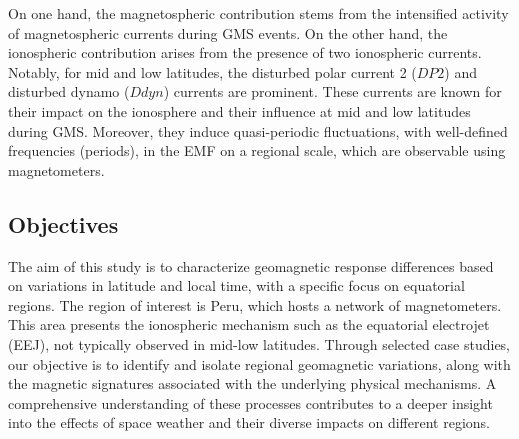\documentclass[12pt]{article}
\begin{document}
On one hand, the magnetospheric contribution stems from the intensified activity of magnetospheric currents during GMS events. On the other hand, the ionospheric contribution arises from the presence of two ionospheric currents. Notably, for mid and low latitudes, the disturbed polar current 2 ($DP2$) \citep{nishida_68_fluctuations} and disturbed dynamo ($Ddyn$) \citep{blanc_ddyn} currents are prominent. These currents are known for their impact on the ionosphere and their influence at mid and low latitudes during GMS. Moreover, they induce quasi-periodic fluctuations, with well-defined frequencies (periods), in the EMF on a regional scale, which are observable using magnetometers.


\subsection{Objectives}

The aim of this study is to characterize geomagnetic response differences based on variations in latitude and local time, with a specific focus on equatorial regions. The region of interest is Peru, which hosts a network of magnetometers. This area presents the ionospheric mechanism such as the equatorial electrojet (EEJ), not typically observed in mid-low latitudes. Through selected case studies, our objective is to identify and isolate regional geomagnetic variations, along with the magnetic signatures associated with the underlying physical mechanisms. A comprehensive understanding of these processes contributes to a deeper insight into the effects of space weather and their diverse impacts on different regions.\\
\end{document}
